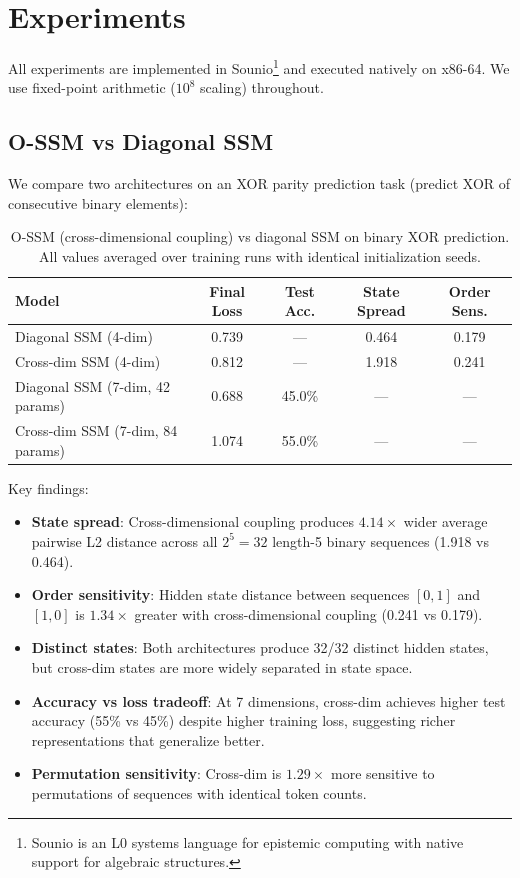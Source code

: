 \documentclass{article}
\begin{document}
\section{Experiments}
\label{sec:experiments}

All experiments are implemented in Sounio\footnote{Sounio is an L0 systems language for epistemic computing with native support for algebraic structures.} and executed natively on x86-64.
We use fixed-point arithmetic ($10^8$ scaling) throughout.

\subsection{O-SSM vs Diagonal SSM}

We compare two architectures on an XOR parity prediction task (predict XOR of consecutive binary elements):

\begin{table}[h]
\centering
\caption{O-SSM (cross-dimensional coupling) vs diagonal SSM on binary XOR prediction. All values averaged over training runs with identical initialization seeds.}
\label{tab:comparison}
\begin{tabular}{@{}lcccc@{}}
\toprule
\textbf{Model} & \textbf{Final Loss} & \textbf{Test Acc.} & \textbf{State Spread} & \textbf{Order Sens.} \\
\midrule
Diagonal SSM (4-dim) & 0.739 & --- & 0.464 & 0.179 \\
Cross-dim SSM (4-dim) & 0.812 & --- & 1.918 & 0.241 \\
\midrule
Diagonal SSM (7-dim, 42 params) & 0.688 & 45.0\% & --- & --- \\
Cross-dim SSM (7-dim, 84 params) & 1.074 & 55.0\% & --- & --- \\
\bottomrule
\end{tabular}
\end{table}

Key findings:
\begin{itemize}
    \item \textbf{State spread}: Cross-dimensional coupling produces $4.14\times$ wider average pairwise L2 distance across all $2^5 = 32$ length-5 binary sequences (1.918 vs 0.464).
    \item \textbf{Order sensitivity}: Hidden state distance between sequences $[0,1]$ and $[1,0]$ is $1.34\times$ greater with cross-dimensional coupling (0.241 vs 0.179).
    \item \textbf{Distinct states}: Both architectures produce 32/32 distinct hidden states, but cross-dim states are more widely separated in state space.
    \item \textbf{Accuracy vs loss tradeoff}: At 7 dimensions, cross-dim achieves higher test accuracy (55\% vs 45\%) despite higher training loss, suggesting richer representations that generalize better.
    \item \textbf{Permutation sensitivity}: Cross-dim is $1.29\times$ more sensitive to permutations of sequences with identical token counts.
\end{itemize}
\end{document}
